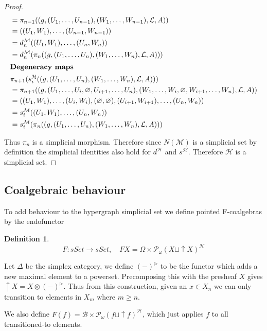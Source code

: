 \documentclass[12pt]{article}
\theoremstyle{definition}
\newtheorem{definition}[theorem]{Definition}
\newcommand{\1}{\mathbbm{1}}
\newcommand{\B}{\mathcal{B}}
\newcommand{\M}{\mathcal{M}}
\renewcommand{\H}{\mathcal{H}}
\newcommand{\finP}{\mathcal{P}_{\omega}}
\begin{document}
\begin{proof}
\begin{align*}
        &= \pi_{n-1}((g, (U_1, \ldots, U_{n-1}), (W_1, \ldots, W_{n-1}), \mathcal{L}, A)) \\
        &= ((U_1, W_1), \ldots, (U_{n-1}, W_{n-1})) \\
        &= d_n^\mathcal{M}((U_1, W_1), \ldots, (U_n, W_n)) \\
        &= d_n^\mathcal{M}(\pi_n((g, (U_1, \ldots, U_n), (W_1, \ldots, W_n), \mathcal{L}, A)))\\
        \intertext{\textbf{Degeneracy maps}}
        &\pi_{n+1}(s_i^\mathcal{H}((g, (U_1, \ldots, U_n), (W_1, \ldots, W_n), \mathcal{L}, A))) \\
        &= \pi_{n+1}((g, (U_1, \ldots, U_i, \varnothing, U_{i+1}, \ldots, U_n), (W_1, \ldots, W_i, \varnothing, W_{i+1}, \ldots, W_n), \mathcal{L}, A)) \\
        &= ((U_1, W_1), \ldots, (U_i, W_i), (\varnothing, \varnothing), (U_{i+1}, W_{i+1}), \ldots, (U_n, W_n)) \\
        &= s_i^\mathcal{M}((U_1, W_1), \ldots, (U_n, W_n)) \\
        &= s_i^\mathcal{M}(\pi_n((g, (U_1, \ldots, U_n), (W_1, \ldots, W_n), \mathcal{L}, A)))
    \end{align*}

    Thus $\pi_n$ is a simplicial morphism. Therefore since $N(\M)$ is a simplicial set by definition the simplicial identities also hold for $d^{\H}$ and $s^{\H}$. Therefore $\H$ is a simplicial set.
\end{proof}

\subsection{Coalgebraic behaviour}
To add behaviour to the hypergraph simplicial set we define pointed F-coalgebras by the endofunctor

\begin{definition}
    \[
        F: sSet \to sSet, \quad FX = \Omega \times \finP(X \sqcup \uparrow X)^{\H}
    \]
    
    Let $\Delta$ be the simplex category, we define $(-)^{\rhd}$ to be the functor which adds a new maximal element to a powerset. Precomposing this with the presheaf $X$ gives $\uparrow X = X\otimes (-)^{\rhd}$. Thus from this construction, given an $x\in X_n$ we can only transition to elements in $X_m$ where $m\geq n$.
    
    We also define $F(f) = \B\times\finP(f \sqcup \uparrow f)^{\H}$, which just applies $f$ to all transitioned-to elements.
\end{definition}
\end{document}
